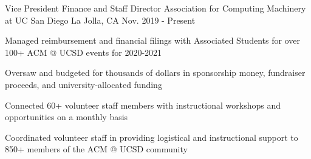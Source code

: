 

\begin{cventries}


  \cventry
    {Vice President Finance and Staff Director} %
    {Association for Computing Machinery at UC San Diego} %
    {La Jolla, CA} %
    {Nov. 2019 - Present} %
    {
      \begin{cvitems} %
        \item {Managed reimbursement and financial filings with Associated Students for over 100+ ACM @ UCSD events for 2020-2021}
        \item {Oversaw and budgeted for thousands of dollars in sponsorship money, fundraiser proceeds, and university-allocated funding}
        \item {Connected 60+ volunteer staff members with instructional workshops and opportunities on a monthly basis}
        \item {Coordinated volunteer staff in providing logistical and instructional support to 850+ members of the ACM @ UCSD community}
      \end{cvitems}
    }


\end{cventries}
